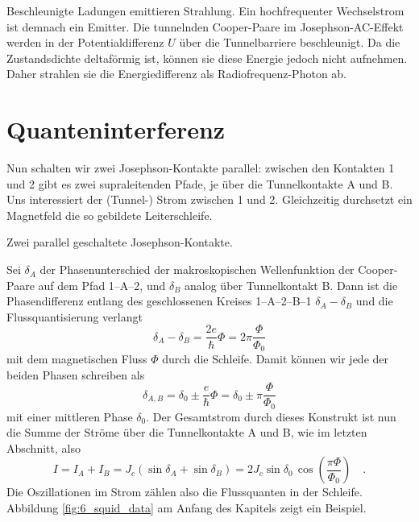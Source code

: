 Beschleunigte Ladungen emittieren Strahlung. Ein hochfrequenter Wechselstrom ist demnach ein Emitter. Die tunnelnden Cooper-Paare im Josephson-AC-Effekt werden in der Potentialdifferenz $U$ über die Tunnelbarriere beschleunigt. Da die Zustandsdichte deltaförmig ist, können sie diese Energie jedoch nicht aufnehmen. Daher strahlen sie die Energiedifferenz als Radiofrequenz-Photon ab.



\section*{Quanteninterferenz}


Nun schalten wir zwei Josephson-Kontakte parallel: zwischen den Kontakten 1 und 2 gibt es zwei supraleitenden Pfade, je über die Tunnelkontakte A und B. Uns interessiert der (Tunnel-) Strom zwischen 1 und 2. Gleichzeitig durchsetzt ein Magnetfeld die so gebildete Leiterschleife.

\begin{marginfigure}
    \caption{Zwei parallel geschaltete Josephson-Kontakte.}
\end{marginfigure}


Sei $\delta_A$ der Phasenunterschied der makroskopischen Wellenfunktion der Cooper-Paare auf dem Pfad 1--A--2, und $\delta_B$ analog über Tunnelkontakt B. Dann ist die Phasendifferenz entlang des geschlossenen Kreises 1--A--2--B--1 $\delta_A - \delta_B$ und die Flussquantisierung verlangt
\begin{equation}
    \delta_A - \delta_B = \frac{2e}{\hbar} \Phi = 2 \pi \frac{\Phi}{\Phi_0}
\end{equation}
mit dem magnetischen Fluss $\Phi$ durch die Schleife. Damit können wir jede der beiden Phasen schreiben als
\begin{equation}
    \delta_{A,B} = \delta_0 \pm  \frac{e}{\hbar} \Phi = \delta_0 \pm \pi \frac{\Phi}{\Phi_0}
\end{equation}
mit einer mittleren Phase $\delta_0$. Der Gesamtstrom durch dieses Konstrukt ist nun die Summe der Ströme über die Tunnelkontakte A und B, wie im letzten Abschnitt, also
\begin{equation}
    I = I_A + I_B = J_c \left( \sin \delta_A +  \sin \delta_B \right) =
     2 J_c \sin \delta_0 \,  \cos \left( \frac{\pi \Phi}{\Phi_0}  \right)  \quad .
\end{equation}
Die Oszillationen im Strom zählen also die Flussquanten in der Schleife.  Abbildung \ref{fig:6_squid_data} am Anfang des Kapitels zeigt ein Beispiel.

